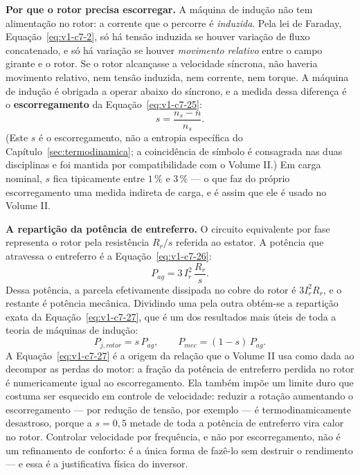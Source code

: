 \documentclass[12pt,a4paper]{article}
\numberwithin{equation}{section}
\numberwithin{table}{section}
\numberwithin{figure}{section}
\begin{document}
\textbf{Por que o rotor precisa escorregar.} A máquina de indução não tem
alimentação no rotor: a corrente que o percorre é \emph{induzida}. Pela lei de
Faraday, Equação~\eqref{eq:v1-c7-2}, só há tensão induzida se houver variação
de fluxo concatenado, e só há variação se houver \emph{movimento relativo}
entre o campo girante e o rotor. Se o rotor alcançasse a velocidade síncrona,
não haveria movimento relativo, nem tensão induzida, nem corrente, nem torque.
A máquina de indução é obrigada a operar abaixo do síncrono, e a medida dessa
diferença é o \textbf{escorregamento} da Equação~\eqref{eq:v1-c7-25}:
\begin{equation}\label{eq:v1-c7-25}
s = \frac{n_s - n}{n_s} .
\end{equation}
(Este $s$ é o escorregamento, não a entropia específica do
Capítulo~\ref{sec:termodinamica}; a coincidência de símbolo é consagrada nas
duas disciplinas e foi mantida por compatibilidade com o Volume II.) Em carga
nominal, $s$ fica tipicamente entre $1\,\%$ e $3\,\%$ --- o que faz do próprio
escorregamento uma medida indireta de carga, e é assim que ele é usado no
Volume II.

\textbf{A repartição da potência de entreferro.} O circuito equivalente por
fase representa o rotor pela resistência $R_r/s$ referida ao estator. A
potência que atravessa o entreferro é a Equação~\eqref{eq:v1-c7-26}:
\begin{equation}\label{eq:v1-c7-26}
P_{ag} = 3\,I_r^{2}\,\frac{R_r}{s} .
\end{equation}
Dessa potência, a parcela efetivamente dissipada no cobre do rotor é
$3I_r^2R_r$, e o restante é potência mecânica. Dividindo uma pela outra
obtém-se a repartição exata da Equação~\eqref{eq:v1-c7-27}, que é um dos
resultados mais úteis de toda a teoria de máquinas de indução:
\begin{equation}\label{eq:v1-c7-27}
P_{j,rotor} = s\,P_{ag},
\qquad
P_{mec} = (1-s)\,P_{ag} .
\end{equation}
A Equação~\eqref{eq:v1-c7-27} é a origem da relação que o Volume II usa como
dada ao decompor as perdas do motor: a fração da potência de entreferro perdida
no rotor é numericamente igual ao escorregamento. Ela também impõe um limite
duro que costuma ser esquecido em controle de velocidade: reduzir a rotação
aumentando o escorregamento --- por redução de tensão, por exemplo --- é
termodinamicamente desastroso, porque a $s = 0{,}5$ metade de toda a potência
de entreferro vira calor no rotor. Controlar velocidade por frequência, e não
por escorregamento, não é um refinamento de conforto: é a única forma de fazê-lo
sem destruir o rendimento --- e essa é a justificativa física do inversor.
\end{document}

